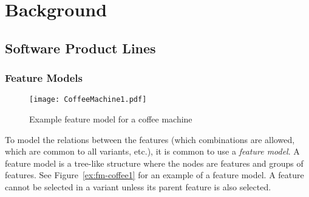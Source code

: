 \chapter{Background} 
\label{cha:background}

\section{Software Product Lines}
\label{sec:software-product-lines}


\subsection{Feature Models}
\label{sub:feature-models}

\begin{figure}
   \begin{center}
      \texttt{[image: CoffeeMachine1.pdf]}
   \end{center}
   \caption[Example feature model for a coffee machine]{Example feature model for a coffee machine \protect\footnotemark}
   \label{ex:fm-coffee1}
\end{figure}

To model the relations between the features (which combinations are allowed, which are common to all variants, etc.), it is common to use a \emph{feature model}. A feature model is a tree-like structure where the nodes are features and groups of features. See Figure~\vref{ex:fm-coffee1} for an example of a feature model. A feature cannot be selected in a variant unless its parent feature is also selected. \cite{art:feature-models-grammars-and-propositional-formulas}

